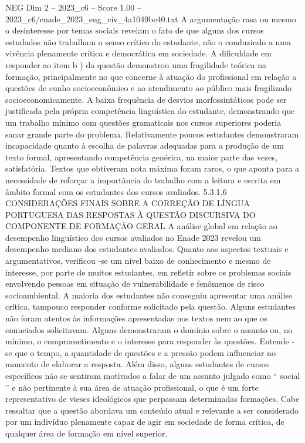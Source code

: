 \begin{textsample}{NEG Dim 2 – 2023\_c6 – Score 1.00 – 2023\_c6/enade\_2023\_eng\_civ\_4a1049be40.txt}
A argumentação rasa ou mesmo o desinteresse por temas sociais revelam o fato de que alguns dos cursos estudados não trabalham o senso crítico do estudante, não o conduzindo a uma vivência plenamente crítica e democrática em sociedade.
A dificuldade em responder ao item b ) da questão demonstrou uma fragilidade teórica na formação, principalmente no que concerne à atuação do profissional em relação a questões de cunho socioeconômico e ao atendimento ao público mais fragilizado socioeconomicamente.
A baixa frequência de desvios morfossintáticos pode ser justificada pela própria competência linguística do estudante, demonstrando que um trabalho mínimo com questões gramaticais nos cursos superiores poderia sanar grande parte do problema.
Relativamente poucos estudantes demonstraram incapacidade quanto à escolha de palavras adequadas para a produção de um texto formal, apresentando competência genérica, na maior parte das vezes, satisfatória.
Textos que obtiveram nota máxima foram raros, o que aponta para a necessidade de reforçar a importância do trabalho com a leitura e escrita em âmbito formal com os estudantes dos cursos avaliados. 5.3.1.6 CONSIDERAÇÕES FINAIS SOBRE A CORREÇÃO DE LÍNGUA PORTUGUESA DAS RESPOSTAS À QUESTÃO DISCURSIVA DO COMPONENTE DE FORMAÇÃO GERAL A análise global em relação ao desempenho linguístico dos cursos avaliados no Enade 2023 revelou um desempenho mediano dos estudantes avaliados.
Quanto aos aspectos textuais e argumentativos, verificou -se um nível baixo de conhecimento e mesmo de interesse, por parte de muitos estudantes, em refletir sobre os problemas sociais envolvendo pessoas em situação de vulnerabilidade e fenômenos de risco socioambiental.
A maioria dos estudantes não conseguiu apresentar uma análise crítica, tampouco responder conforme solicitado pela questão.
Alguns estudantes não foram atentos às informações apresentadas nos textos nem ao que os enunciados solicitavam.
Alguns demonstraram o domínio sobre o assunto ou, no mínimo, o comprometimento e o interesse para responder às questões.
Entende -se que o tempo, a quantidade de questões e a pressão podem influenciar no momento de elaborar a resposta.
Além disso, alguns estudantes de cursos específicos não se sentiram motivados a falar de um assunto julgado como “ social ” e não pertinente à sua área de atuação profissional, o que é um forte representativo de vieses ideológicos que perpassam determinadas formações.
Cabe ressaltar que a questão abordava um conteúdo atual e relevante a ser considerado por um indivíduo plenamente capaz de agir em sociedade de forma crítica, de qualquer área de formação em nível superior.

\end{textsample}
